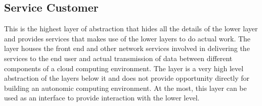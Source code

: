 \subsection{Service Customer}
This is the highest layer of abstraction that hides all the details of the lower layer and provides services that makes use of the lower layers to do actual work. The layer houses the front end and other network services involved in delivering the services to the end user and actual transmission of data between different components of a cloud computing environment.
The layer is a very high level abstraction of the layers below it and does not provide opportunity directly for building an autonomic computing environment. At the most, this layer can be used as an interface to provide interaction with the lower level.


